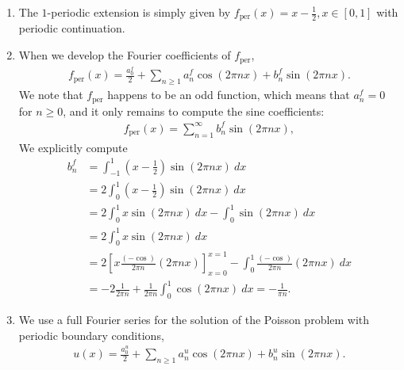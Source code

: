 \documentclass[11pt]{article}
\begin{document}
\begin{solution}
    \begin{enumerate}
        \item The $1$-periodic extension is simply given by $f_{\text{per}}(x) = x - \frac 1 2, x \in [0, 1]$ with periodic continuation.
        \item When we develop the Fourier coefficients of $f_{\text{per}}$, 
        \begin{align*}
            f_{\text{per}}(x) = \frac{a^{f}_0}{2} + \sum_{n \geq 1} a^{f}_{n} \cos( 2 \pi n x ) + b^{f}_{n} \sin( 2 \pi n x ).
        \end{align*}
        We note that $f_{\text{per}}$ happens to be an odd function, which means that $a^{f}_n = 0$ for $n \geq 0$,
        and it only remains to compute the sine coefficients:
        \begin{align*}
            f_{\text{per}}(x) = \sum_{n=1}^{\infty} b^{f}_n \sin(2 \pi n x),
        \end{align*}
        We explicitly compute 
        \begin{align*}
            b^{f}_n 
            &= 
              \int_{-1}^{1} \left( x- \frac 1 2 \right) \sin(2 \pi n x) \ dx 
            \\&= 
            2 
            \int_{ 0}^{1} \left( x- \frac 1 2 \right) \sin(2 \pi n x) \ dx 
            \\&= 
            2 
            \int_{ 0}^{1} x \sin(2 \pi n x) \ dx 
            - 
            \int_{ 0}^{1} \sin(2 \pi n x) \ dx 
            \\&= 
            2 
            \int_{ 0}^{1} x \sin(2 \pi n x) \ dx 
            \\&= 
            2 
            \left[ x \frac{(-\cos)}{2\pi n}(2 \pi n x) \right]_{x=0}^{x=1}
            -
            \int_{0}^{1} \frac{(-\cos)}{2\pi n}(2 \pi n x) \ dx 
            \\&= 
            -
            2 
            \frac{1}{2\pi n}
            + 
            \frac{1}{2\pi n}
            \int_{0}^{1} \cos(2 \pi n x) \ dx 
            = 
            - \frac{1}{\pi n} %
            .
        \end{align*}
        \item 
        We use a full Fourier series for the solution of the Poisson problem with periodic boundary conditions,
        \begin{align*}
            u(x) = \frac{a^{u}_0}{2} + \sum_{n \geq 1} a^{u}_{n} \cos( 2 \pi n x ) + b^{u}_{n} \sin( 2 \pi n x ).

\end{align*}
\end{enumerate}
\end{solution}
\end{document}
